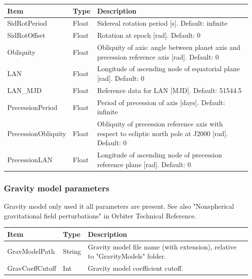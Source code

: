 \documentclass[Orbiter Developer Manual.tex]{subfiles}
\begin{document}
	\begin{longtable}{ |p{}|p{}|p{}| }
	\hline\rule{0pt}{2ex}
	\textbf{Item} & \textbf{Type} & \textbf{Description}\\
	\hline\rule{0pt}{2ex}
	SidRotPeriod & Float & Sidereal rotation period [s]. Default: infinite\\
	\hline\rule{0pt}{2ex}
	SidRotOffset & Float & Rotation at epoch [rad]. Default: 0\\
	\hline\rule{0pt}{2ex}
	Obliquity & Float & Obliquity of axis: angle between planet axis and precession reference axis [rad]. Default: 0\\
	\hline\rule{0pt}{2ex}
	LAN & Float & Longitude of ascending node of equatorial plane [rad]. Default: 0\\
	\hline\rule{0pt}{2ex}
	LAN\_MJD & Float & Reference data for LAN [MJD]. Default: 51544.5\\
	\hline\rule{0pt}{2ex}
	PrecessionPeriod & Float & Period of precession of axis [days]. Default: infinite\\
	\hline\rule{0pt}{2ex}
	PrecessionObliquity & Float & Obliquity of precession reference axis with respect to ecliptic north pole at J2000 [rad]. Default: 0\\
	\hline\rule{0pt}{2ex}
	PrecessionLAN & Float & Longitude of ascending node of precession reference plane [rad]. Default: 0\\
	\hline
	\end{longtable}


\subsubsection*{Gravity model parameters}
Gravity model only used it all parameters are present. See also "Nonspherical gravitational field perturbations" in Orbiter Technical Reference.

	\begin{longtable}{ |p{}|p{}|p{}| }
	\hline\rule{0pt}{2ex}
	\textbf{Item} & \textbf{Type} & \textbf{Description}\\
	\hline\rule{0pt}{2ex}
	GravModelPath & String & Gravity model file name (with extension), relative to "GravityModels" folder.\\
	\hline\rule{0pt}{2ex}
	GravCoeffCutoff & Int & Gravity model coefficient cutoff.\\
	\hline
	\end{longtable}
\end{document}
